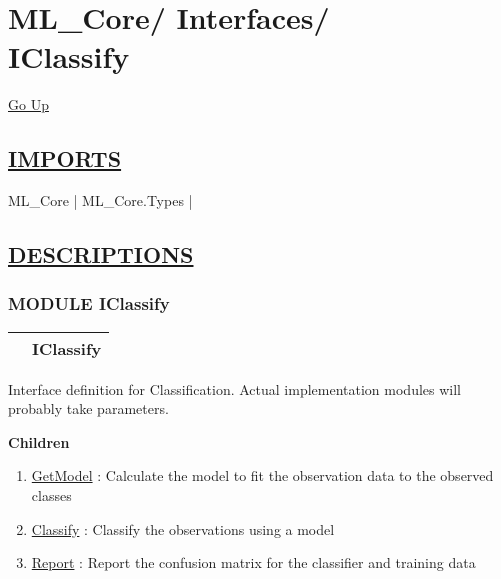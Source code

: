 \chapter*{\color{headfile}
{\large ML\_Core\slash\hspace{0pt}}
{\large Interfaces\slash\hspace{0pt}}
 \\
IClassify
}
\hypertarget{ecldoc:toc:ML_Core.Interfaces.IClassify}{}
\hyperlink{ecldoc:toc:root/ML_Core/Interfaces}{Go Up}

\section*{\underline{\textsf{IMPORTS}}}
\begin{doublespace}
{\large
ML\_Core |
ML\_Core.Types |
}
\end{doublespace}

\section*{\underline{\textsf{DESCRIPTIONS}}}
\subsection*{\textsf{\colorbox{headtoc}{\color{white} MODULE}
IClassify}}

\hypertarget{ecldoc:ML_Core.Interfaces.IClassify}{}

{\renewcommand{\arraystretch}{1.5}
\begin{tabularx}{\textwidth}{|>{\raggedright\arraybackslash}l|X|}
\hline
\hspace{0pt}\mytexttt{\color{red} } & \textbf{IClassify} \\
\hline
\end{tabularx}
}

\par
Interface definition for Classification. Actual implementation modules will probably take parameters.


\textbf{Children}
\begin{enumerate}
\item \hyperlink{ecldoc:ml_core.interfaces.iclassify.getmodel}{GetModel}
: Calculate the model to fit the observation data to the observed classes
\item \hyperlink{ecldoc:ml_core.interfaces.iclassify.classify}{Classify}
: Classify the observations using a model
\item \hyperlink{ecldoc:ml_core.interfaces.iclassify.report}{Report}
: Report the confusion matrix for the classifier and training data
\end{enumerate}

